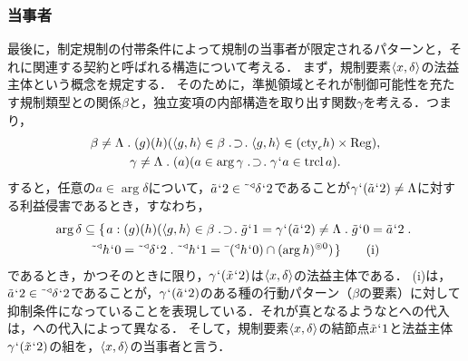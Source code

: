\subsubsection{当事者}
\label{sssec:当事者}

最後に，制定規制の付帯条件によって規制の当事者が限定されるパターンと，それに関連する契約と呼ばれる構造について考える．
まず，規制要素$ \langle x,\delta \rangle $の法益主体という概念を規定する．
そのために，準拠領域とそれが制御可能性を充たす規制類型との関係$\beta$と，独立変項の内部構造を取り出す関数$\gamma$を考える．つまり，
\begin{gather*}
    \beta\neq\Lambda\con{1}(g)(h)(\orp{g,h}\in\beta\case{1}{1}{1}\orp{g,h}\in(\cty{\epsilon}h)\times\mathrm{Reg}),\\
    \gamma\neq\Lambda\con{1}(a)(a\in\arg \gamma \case{1}{1}{1}\gamma\fap a\in \trcl a).
\end{gather*}
すると，任意の$ a\in\arg \delta $について，$ \tilde{a}{\mspace{1mu}{`}\mspace{1mu}} 2\in\tilde{\:\:}{^\triangleleft}\delta{\mspace{1mu}{`}\mspace{1mu}} 2 $であることが$ \gamma{\mspace{1mu}{`}\mspace{1mu}}(\tilde{a}{\mspace{1mu}{`}\mspace{1mu}} 2)\neq\Lambda $に対する利益侵害であるとき，すなわち，
\begin{multline*}
    \arg \delta \subseteq \classab{a:
        (g)(h)(\orp{g,h}\in\beta\case{1}{1}{1}
            \tilde{g}\fap 1 = \gamma\fap(\tilde{a}\fap 2)\neq\Lambda\con{1}\tilde{g}\fap 0 = \tilde{a}\fap 2\con{1}\\
            \tildel{\trgl{h}}\fap 0 = \tildel{\trgl{\delta}}\fap 2\con{1}\tildel{\trgl{h}}\fap 1 = \barl{(\trgl{h}\fap 0)}\cap\msec{(\arg h)}{0}
        )
    } \tag{i}
\end{multline*}
であるとき，かつそのときに限り，$ \gamma{\mspace{1mu}{`}\mspace{1mu}}(\tilde{x}{\mspace{1mu}{`}\mspace{1mu}} 2) $は$ \langle x,\delta \rangle $の法益主体である．
(i)は，$ \tilde{a}{\mspace{1mu}{`}\mspace{1mu}} 2\in\tilde{\:\:}{^\triangleleft}\delta{\mspace{1mu}{`}\mspace{1mu}} 2 $であることが，$ \gamma{\mspace{1mu}{`}\mspace{1mu}}(\tilde{a}{\mspace{1mu}{`}\mspace{1mu}} 2) $のある種の行動パターン（$\beta$の要素）に対して抑制条件になっていることを表現している．それが真となるような\kagi{$ \beta $}と\kagi{$ \gamma $}への代入は，\kagi{$ \delta $}への代入によって異なる．
そして，規制要素$ \langle x,\delta \rangle $の結節点$ \tilde{x}{\mspace{1mu}{`}\mspace{1mu}} 1 $と法益主体$ \gamma{\mspace{1mu}{`}\mspace{1mu}}(\tilde{x}{\mspace{1mu}{`}\mspace{1mu}} 2) $の組を，$ \langle x,\delta \rangle $の当事者と言う．

